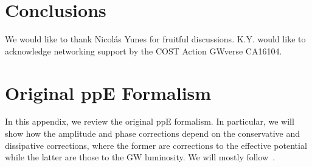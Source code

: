 \documentclass[prd,twocolumn,nofootinbib]{revtex4-1}
\begin{document}
\begin{comment}
 \hline
 \vspace{20pt}
 \tiny Varying-G Theory&\rule{0pt}{4ex}\tiny $\bm{-\frac{75 m_0 {\eta_0}^{3/5}}{851968 {G_0}^{10/3}} \bigg(\frac{11 \dot{G}}{3 G_0} + \frac{17 \dot{M}}{3M_0}-\frac{m_{1,0}\dot{m_2}+m_{2,0}\dot{m_1}}{{m_0}^2 \eta0}\bigg)}$&\tiny-13&\tiny$\bm{\frac{-5 m_0 {\eta_0}^{3/5}}{512 {G_0}^{5/3}} \bigg(\frac{7 \dot{G}}{ G_0} + \frac{5\dot{M}}{m_0}+\frac{m_{1,0}\dot{m_2}+m_{2,0}\dot{m_1}}{{m_0}^2 \eta0}\bigg)}$&\tiny-8\\
\hline
\end{tabular}
\end{comment}



\section{Conclusions}
\label{sec:conclusions}

\acknowledgments
We would like to thank Nicol\' as Yunes for fruitful discussions.
K.Y. would like to acknowledge networking support by the COST Action GWverse CA16104.

 \appendix 
 
 \section{Original ppE Formalism}
 \label{appendix}

In this appendix, we review the original ppE formalism. In particular, we will show how the amplitude and phase corrections depend on the conservative and dissipative corrections, where the former are corrections to the effective potential while the latter are those to the GW luminosity. We will mostly follow~\cite{Chatziioannou:2012rf}.
\end{document}
